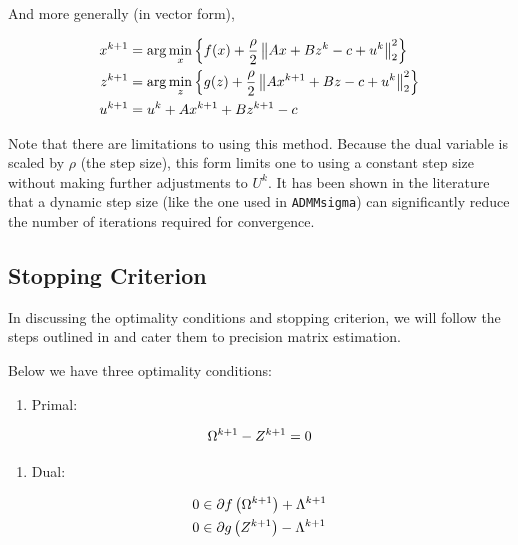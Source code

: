 \documentclass[11pt,]{report}
\providecommand{\tightlist}{%
  \setlength{\itemsep}{0pt}\setlength{\parskip}{0pt}}
\begin{document}
And more generally (in vector form),

\begin{align}
  x^{k + 1} &= \arg\min_{x}\left\{ f(x) + \frac{\rho}{2}\left\| Ax + Bz^{k} - c + u^{k} \right\|_{2}^{2} \right\} \label{eq:xscaled}\notag \\
  z^{k + 1} &= \arg\min_{z}\left\{ g(z) + \frac{\rho}{2}\left\| Ax^{k + 1} + Bz - c + u^{k} \right\|_{2}^{2} \right\} \label{eq:zscaled}\notag \\
  u^{k + 1} &= u^{k} + Ax^{k + 1} + Bz^{k + 1} - c \label{eq:uscaled}\notag
\end{align}

Note that there are limitations to using this method. Because the dual variable is scaled by \(\rho\) (the step size), this form limits one to using a constant step size without making further adjustments to \(U^{k}\). It has been shown in the literature that a dynamic step size (like the one used in \texttt{ADMMsigma}) can significantly reduce the number of iterations required for convergence.

\hypertarget{stopping-criterion}{%
\subsection{Stopping Criterion}\label{stopping-criterion}}

In discussing the optimality conditions and stopping criterion, we will follow the steps outlined in \citet{boyd2011distributed} and cater them to precision matrix estimation.

Below we have three optimality conditions:

\begin{enumerate}
\def\labelenumi{\arabic{enumi}.}
\tightlist
\item
  Primal:
\end{enumerate}

\begin{equation}
\Omega^{k + 1} - Z^{k + 1} = 0
\label{eq:admmprimal}\notag
\end{equation}

\begin{enumerate}
\def\labelenumi{\arabic{enumi}.}
\setcounter{enumi}{1}
\tightlist
\item
  Dual:
\end{enumerate}

\begin{equation}
\begin{split}
  0 &\in \partial f\left(\Omega^{k + 1}\right) + \Lambda^{k + 1} \\
  0 &\in \partial g\left(Z^{k + 1}\right) - \Lambda^{k + 1}
\label{eq:admmdual}\notag
\end{split}
\end{equation}
\end{document}
